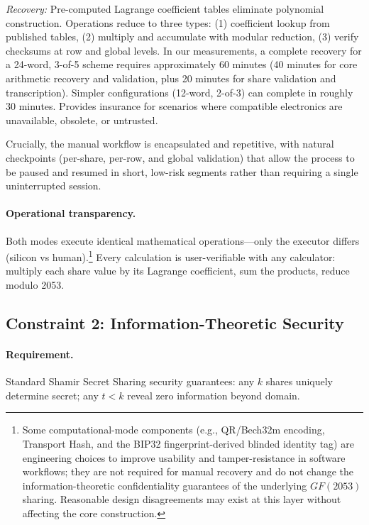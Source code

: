 \documentclass[11pt]{article}
\begin{document}
\textit{Recovery:} Pre-computed Lagrange coefficient tables eliminate polynomial construction. Operations reduce to three types: (1) coefficient lookup from published tables, (2) multiply and accumulate with modular reduction, (3) verify checksums at row and global levels. In our measurements, a complete recovery for a 24-word, 3-of-5 scheme requires approximately 60 minutes (40 minutes for core arithmetic recovery and validation, plus 20 minutes for share validation and transcription). Simpler configurations (12-word, 2-of-3) can complete in roughly 30 minutes. Provides insurance for scenarios where compatible electronics are unavailable, obsolete, or untrusted.

Crucially, the manual workflow is encapsulated and repetitive, with natural checkpoints (per-share, per-row, and global validation) that allow the process to be paused and resumed in short, low-risk segments rather than requiring a single uninterrupted session.

\paragraph{Operational transparency.} Both modes execute identical mathematical operations---only the executor differs (silicon vs human).\footnote{Some computational-mode components (e.g., QR/Bech32m encoding, Transport Hash, and the BIP32 fingerprint-derived blinded identity tag) are engineering choices to improve usability and tamper-resistance in software workflows; they are not required for manual recovery and do not change the information-theoretic confidentiality guarantees of the underlying $GF(2053)$ sharing. Reasonable design disagreements may exist at this layer without affecting the core construction.} Every calculation is user-verifiable with any calculator: multiply each share value by its Lagrange coefficient, sum the products, reduce modulo 2053.

\subsection{Constraint 2: Information-Theoretic Security}

\paragraph{Requirement.} Standard Shamir Secret Sharing security guarantees: any $k$ shares uniquely determine secret; any $t < k$ reveal zero information beyond domain.
\end{document}
